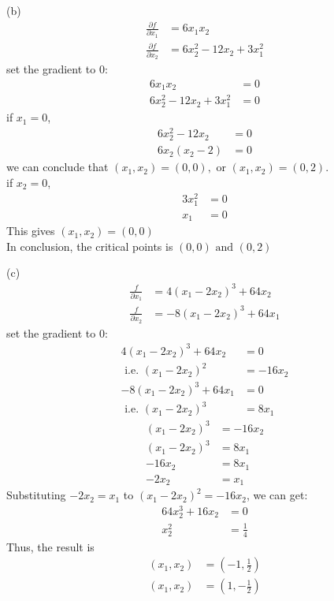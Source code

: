 \documentclass[a4paper,12pt]{article}
\begin{document}
(b) 
\begin{align*}
    \frac{\partial f}{\partial x_1} &= 6x_1x_2 \\
    \frac{\partial f}{\partial x_2} &= 6x_2^2 - 12x_2 + 3x_1^2 
\end{align*}
set the gradient to 0:
\begin{align*}
    6x_1x_2 &= 0 \\
    6x_2^2 - 12x_2 + 3x_1^2 &= 0
\end{align*}
if \(x_1 = 0\), 
\begin{align*}
    6x_2^2 - 12x_2 &= 0 \\
    6x_2(x_2 - 2) &= 0
\end{align*}
we can conclude that \((x_1 ,x_2) = (0, 0), \text{ or } (x_1 ,x_2) = (0, 2).\) \\
if \(x_2 = 0\), 
\begin{align*}
    3x_1^2 &= 0 \\
    x_1 &= 0
\end{align*}
This gives \((x_1, x_2) = (0, 0)\) \\
In conclusion, the critical points is \((0, 0) \text{ and }(0, 2)\)

(c)
\begin{align*}
    \frac{f}{\partial x_1} &= 4(x_1 - 2x_2)^3 + 64x_2 \\
    \frac{f}{\partial x_2} &= -8(x_1 - 2x_2)^3 + 64x_1
\end{align*}
set the gradient to 0:
\begin{align*}
    4(x_1 - 2x_2)^3 + 64x_2 &= 0 \\
    \text{ i.e. } (x_1 - 2x_2)^2 &= -16x_2 \\
    -8(x_1 - 2x_2)^3 + 64x_1 &= 0 \\
    \text{ i.e. }(x_1 - 2x_2)^3 &= 8x_1
\end{align*}
\begin{align*} 
    (x_1 - 2x_2)^3 &= -16x_2 \\
    (x_1 - 2x_2)^3 &= 8x_1 \\
    -16x_2 &= 8x_1 \\
    -2x_2 &= x_1
\end{align*}
Substituting \(-2x_2 = x_1 \) to \((x_1 - 2x_2)^2 = -16x_2\), we can get:
\begin{align*}
    64x_2^3 + 16x_2 &= 0 \\
    x_2^2 &= \frac{1}{4} 
\end{align*}
Thus, the result is
\begin{align*}
    (x_1, x_2) &= (-1, \frac{1}{2}) \\
    (x_1, x_2) &= (1, -\frac{1}{2})
\end{align*}
\end{document}
